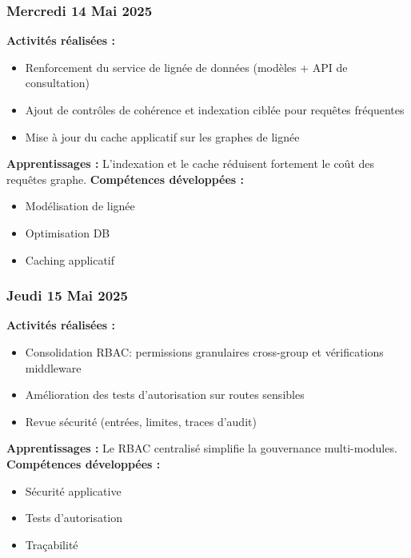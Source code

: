 \documentclass[12pt,a4paper]{article}
\begin{document}
\subsubsection{Mercredi 14 Mai 2025}
\textbf{Activités réalisées :}
\begin{itemize}
    \item Renforcement du service de lignée de données (modèles + API de consultation)
    \item Ajout de contrôles de cohérence et indexation ciblée pour requêtes fréquentes
    \item Mise à jour du cache applicatif sur les graphes de lignée
\end{itemize}
\textbf{Apprentissages :} L'indexation et le cache réduisent fortement le coût des requêtes graphe.
\textbf{Compétences développées :}
\begin{itemize}
    \item Modélisation de lignée
    \item Optimisation DB
    \item Caching applicatif
\end{itemize}

\subsubsection{Jeudi 15 Mai 2025}
\textbf{Activités réalisées :}
\begin{itemize}
    \item Consolidation RBAC: permissions granulaires cross-group et vérifications middleware
    \item Amélioration des tests d'autorisation sur routes sensibles
    \item Revue sécurité (entrées, limites, traces d'audit)
\end{itemize}
\textbf{Apprentissages :} Le RBAC centralisé simplifie la gouvernance multi-modules.
\textbf{Compétences développées :}
\begin{itemize}
    \item Sécurité applicative
    \item Tests d'autorisation
    \item Traçabilité
\end{itemize}
\end{document}
